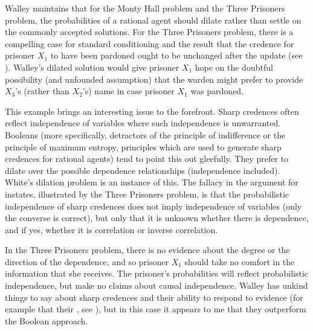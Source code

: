 \documentclass[11pt]{article}
\begin{document}

Walley maintains that for the Monty Hall problem and the Three
Prisoners problem, the probabilities of a rational agent should dilate
rather than settle on the commonly accepted solutions. For the Three
Prisoners problem, there is a compelling case for standard
conditioning and the result that the credence for prisoner $X_{1}$ to
have been pardoned ought to be unchanged after the update (see
). Walley's dilated solution would give
prisoner $X_{1}$ hope on the doubtful possibility (and unfounded
assumption) that the warden might prefer to provide $X_{3}$'s (rather
than $X_{2}$'s) name in case prisoner $X_{1}$ was pardoned.

This example brings an interesting issue to the forefront. Sharp
credences often reflect independence of variables where such
independence is unwarranted. Booleans (more specifically, detractors
of the principle of indifference or the principle of maximum entropy,
principles which are used to generate sharp credences for rational
agents) tend to point this out gleefully. They prefer to dilate over
the possible dependence relationships (independence included). White's
dilation problem is an instance of this. The fallacy in the argument
for instates, illustrated by the Three Prisoners problem, is that the
probabilistic independence of sharp credences does not imply
independence of variables (only the converse is correct), but only
that it is unknown whether there is dependence, and if yes, whether it
is correlation or inverse correlation.

In the Three Prisoners problem, there is no evidence about the degree
or the direction of the dependence, and so prisoner $X_{1}$ should
take no comfort in the information that she receives. The prisoner's
probabilities will reflect probabilistic independence, but make no
claims about causal independence. Walley has unkind things to say
about sharp credences and their ability to respond to evidence (for
example that their , see
), but in this case it appears to me that they
outperform the Boolean approach.
\end{document}
